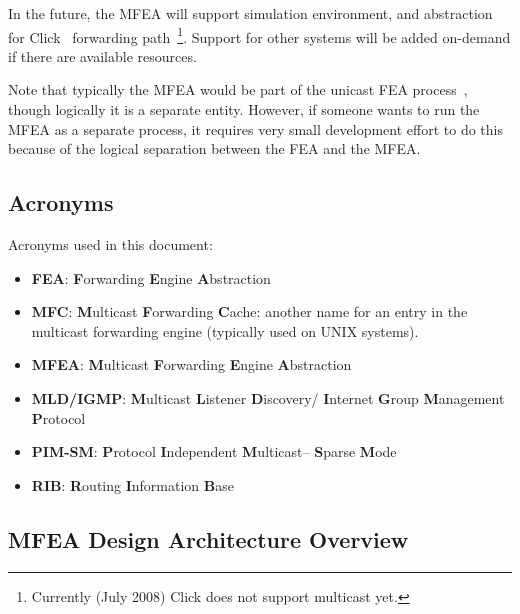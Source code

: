 \documentclass[11pt]{article}
\begin{document}
In the future, the MFEA will support simulation environment, and
abstraction for Click~\cite{CLICK-PROJECT} forwarding
path~\footnote{Currently (July 2008) Click does
not support multicast yet.}. Support for other systems will be added
on-demand if there are available resources.

Note that typically the MFEA would be part of the unicast FEA
process~\cite{xorp:fea}, though logically it is a separate entity.
However, if someone wants to run the MFEA as a separate process, it
requires very small development effort to do this because of the logical
separation between the FEA and the MFEA.

\subsection{Acronyms}

Acronyms used in this document:

\begin{itemize}

  \item {\bf FEA}: {\bf F}orwarding {\bf E}ngine {\bf A}bstraction

  \item {\bf MFC}: {\bf M}ulticast {\bf F}orwarding {\bf C}ache: another
  name for an entry in the multicast forwarding engine (typically used
  on UNIX systems).

  \item {\bf MFEA}: {\bf M}ulticast {\bf F}orwarding {\bf E}ngine
  {\bf A}bstraction

  \item {\bf MLD/IGMP}: {\bf M}ulticast {\bf L}istener {\bf D}iscovery/{\bf
  I}nternet {\bf G}roup {\bf M}anagement {\bf P}rotocol

  \item {\bf PIM-SM}: {\bf P}rotocol {\bf I}ndependent {\bf M}ulticast--{\bf
  S}parse {\bf M}ode

  \item {\bf RIB}: {\bf R}outing {\bf I}nformation {\bf B}ase

\end{itemize}


\subsection{MFEA Design Architecture Overview}
\end{document}
